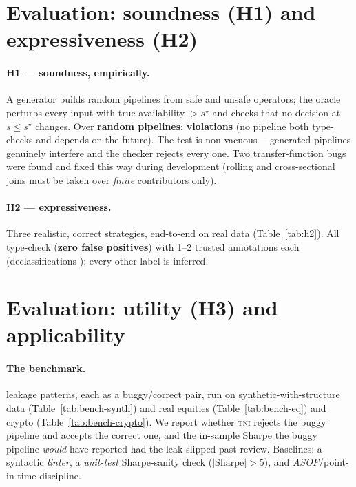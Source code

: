 \documentclass[11pt]{article}
\newcommand{\tni}{\textsc{tni}}
\theoremstyle{plain}
\theoremstyle{definition}
\begin{document}
\section{Evaluation: soundness (H1) and expressiveness (H2)}\label{sec:eval-h1h2}

\paragraph{H1 --- soundness, empirically.}
A generator builds random pipelines from safe and unsafe operators; the oracle
perturbs every input with true availability $>s^\star$ and checks that no
decision at $s\le s^\star$ changes. Over \textbf{\honeTotal{} random pipelines}:
\textbf{\honeViol{} violations} (no pipeline both type-checks and depends on the
future). The test is non-vacuous---\honeInterf{} generated pipelines genuinely
interfere and the checker rejects every one. Two transfer-function bugs were
found and fixed this way during development (rolling and cross-sectional joins
must be taken over \emph{finite} contributors only).

\paragraph{H2 --- expressiveness.}
Three realistic, correct strategies, end-to-end on real data
(Table~\ref{tab:h2}). All type-check (\textbf{zero false positives}) with 1--2
trusted annotations each (declassifications \htwoDecl); every other label is
inferred.



\section{Evaluation: utility (H3) and applicability}\label{sec:eval-h3}

\paragraph{The benchmark.}
\benchN{} leakage patterns, each as a buggy/correct pair, run on
synthetic-with-structure data (Table~\ref{tab:bench-synth}) and real equities
(Table~\ref{tab:bench-eq}) and crypto (Table~\ref{tab:bench-crypto}). We report
whether \tni{} rejects the buggy pipeline and accepts the correct one, and the
in-sample Sharpe the buggy pipeline \emph{would} have reported had the leak
slipped past review. Baselines: a syntactic \emph{linter}, a \emph{unit-test}
Sharpe-sanity check ($|\text{Sharpe}|>5$), and \emph{ASOF}/point-in-time
discipline.
\end{document}
